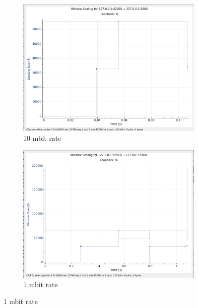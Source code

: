 \documentclass{report}
\begin{document}
\begin{figure}[H]
    \centering
    \begin{subfigure}[b]{0.45\textwidth}
        \centering
        \includegraphics[width=\textwidth]{Pics/Reno/r10mbit_s100k_ws}
        \caption{10 mbit rate}
    \end{subfigure}
    \hfill
    \begin{subfigure}[b]{0.45\textwidth}
        \centering
        \includegraphics[width=\textwidth]{Pics/Reno/r1mbit_s100k_ws}
        \caption{1 mbit rate }
    \end{subfigure}
    \medskip


\end{figure}
\end{document}
